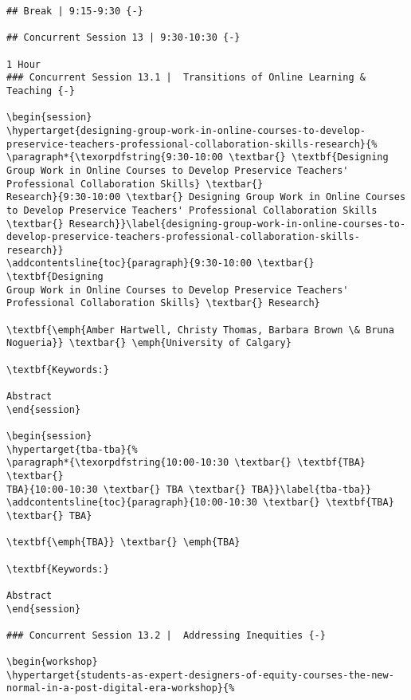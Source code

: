 \documentclass[
]{book}
\begin{document}
\begin{verbatim}
## Break | 9:15-9:30 {-}

## Concurrent Session 13 | 9:30-10:30 {-}

1 Hour
### Concurrent Session 13.1 |  Transitions of Online Learning & Teaching {-}

\begin{session}
\hypertarget{designing-group-work-in-online-courses-to-develop-preservice-teachers-professional-collaboration-skills-research}{%
\paragraph*{\texorpdfstring{9:30-10:00 \textbar{} \textbf{Designing
Group Work in Online Courses to Develop Preservice Teachers'
Professional Collaboration Skills} \textbar{}
Research}{9:30-10:00 \textbar{} Designing Group Work in Online Courses to Develop Preservice Teachers' Professional Collaboration Skills \textbar{} Research}}\label{designing-group-work-in-online-courses-to-develop-preservice-teachers-professional-collaboration-skills-research}}
\addcontentsline{toc}{paragraph}{9:30-10:00 \textbar{} \textbf{Designing
Group Work in Online Courses to Develop Preservice Teachers'
Professional Collaboration Skills} \textbar{} Research}

\textbf{\emph{Amber Hartwell, Christy Thomas, Barbara Brown \& Bruna
Nogueria}} \textbar{} \emph{University of Calgary}

\textbf{Keywords:}

Abstract
\end{session}

\begin{session}
\hypertarget{tba-tba}{%
\paragraph*{\texorpdfstring{10:00-10:30 \textbar{} \textbf{TBA}
\textbar{}
TBA}{10:00-10:30 \textbar{} TBA \textbar{} TBA}}\label{tba-tba}}
\addcontentsline{toc}{paragraph}{10:00-10:30 \textbar{} \textbf{TBA}
\textbar{} TBA}

\textbf{\emph{TBA}} \textbar{} \emph{TBA}

\textbf{Keywords:}

Abstract
\end{session}

### Concurrent Session 13.2 |  Addressing Inequities {-}

\begin{workshop}
\hypertarget{students-as-expert-designers-of-equity-courses-the-new-normal-in-a-post-digital-era-workshop}{%

\end{verbatim}
\end{document}
